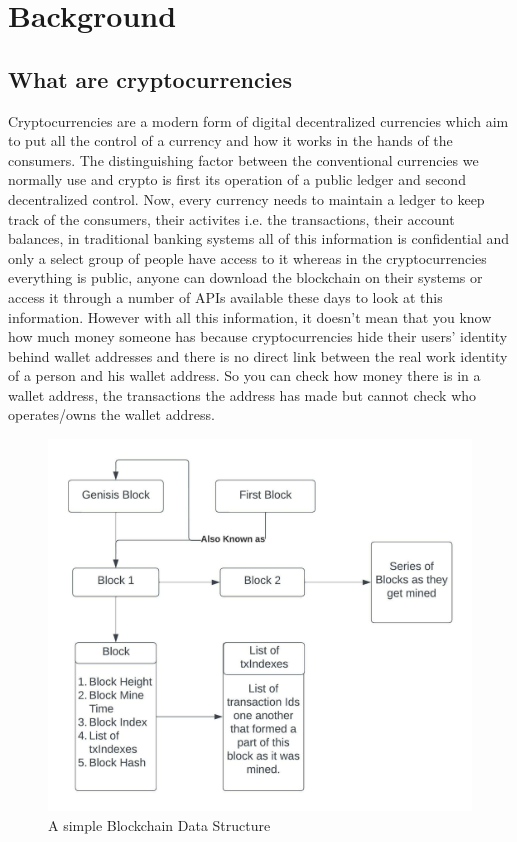 \documentclass{article}
\begin{document}
\pagebreak

\section{Background}
    
    \subsection{What are cryptocurrencies}

        Cryptocurrencies are a modern form of digital decentralized currencies which aim to put all the control of a currency and how it works in the hands of the consumers. The distinguishing factor between the conventional currencies we normally use and crypto is first its operation of a public ledger and second decentralized control. Now, every currency needs to maintain a ledger to keep track of the consumers, their activites i.e. the transactions, their account balances, in traditional banking systems all of this information is confidential and only a select group of people have access to it whereas in the cryptocurrencies everything is public, anyone can download the blockchain on their systems or access it through a number of APIs available these days to look at this information. However with all this information, it doesn't mean that you know how much money someone has because cryptocurrencies hide their users' identity behind wallet addresses and there is no direct link between the real work identity of a person and his wallet address. So you can check how money there is in a wallet address, the transactions the address has made but cannot check who operates/owns the wallet address.


    \begin{figure}
            \centering
            \includegraphics[width=150mm,scale=0.7]{Simple Blockchain.jpeg}
            \caption{A simple Blockchain Data Structure}
            \label{Figure 3}
        \end{figure}
        
\end{document}
